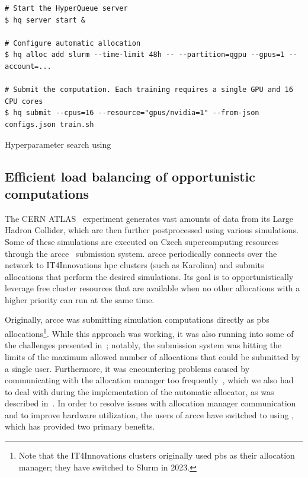 \begin{listing}[h]
	\begin{verbatim}
# Start the HyperQueue server
$ hq server start &

# Configure automatic allocation
$ hq alloc add slurm --time-limit 48h -- --partition=qgpu --gpus=1 --account=...

# Submit the computation. Each training requires a single GPU and 16 CPU cores
$ hq submit --cpus=16 --resource="gpus/nvidia=1" --from-json configs.json train.sh
	\end{verbatim}
	\caption{Hyperparameter search using \hyperqueue{}}
	\label{lst:hq-exa4mind-hyperparameter-search}
\end{listing}

\subsection{Efficient load balancing of opportunistic computations}
The CERN ATLAS~\cite{atlas} experiment generates vast amounts of data from its Large
Hadron Collider, which are then further postprocessed using various simulations. Some of these
simulations are executed on Czech supercomputing resources through the
\gls{arcce}~\cite{atlas-it4i-1} submission system. \gls{arcce}
periodically connects over the network to IT4Innovations \gls{hpc} clusters (such as
Karolina) and submits allocations that perform the desired simulations. Its goal is to
opportunistically leverage free cluster resources that are available when no other allocations with
a higher priority can run at the same time.

Originally, \gls{arcce} was submitting simulation computations directly as
\gls{pbs} allocations\footnote{Note that the IT4Innovations clusters originally used \gls{pbs} as their allocation
manager; they have switched to Slurm in 2023.}. While this approach was working, it was
also running into some of the challenges presented in~; notably, the
submission system was hitting the limits of the maximum allowed number of allocations that could be
submitted by a single user. Furthermore, it was encountering problems caused by communicating with
the allocation manager too frequently~\cite{atlas-it4i-2}, which we also had to deal with
during the implementation of the \hyperqueue{} automatic allocator, as was described
in~. In order to resolve issues with allocation manager communication and to
improve hardware utilization, the users of \gls{arcce} have switched to using
\hyperqueue{}, which has provided two primary benefits.

